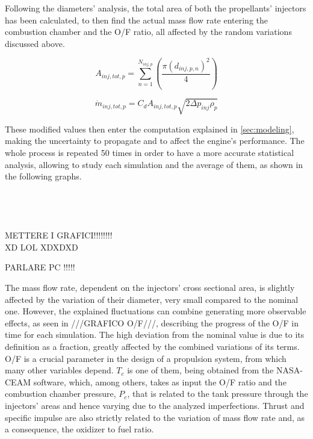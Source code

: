Following the diameters' analysis, the total area of both the propellants' injectors has been calculated, to then find the actual mass flow rate entering the combustion chamber and the O/F ratio, all affected by the random variations discussed above. 


\begin{equation}
	A_{inj,tot,p} = \sum_{n=1}^{N_{inj,p}} \left(\frac{\pi(d_{inj,p,n})^2}{4} \right)
    \label{eq:totalarea}
\end{equation}

\begin{equation}
    \dot m_{inj,tot,p} = C_{d}A_{inj,tot,p}\sqrt{2\Delta p_{inj}\rho_p}
    \label{eq:massflow}
\end{equation}

These modified values then enter the computation explained in \autoref{sec:modeling}, making the uncertainty to propagate and to affect the engine's performance. The whole process is repeated 50 times in order to have a more accurate statistical analysis, allowing to study each simulation and the average of them, as shown in the following graphs.
\\
\\
\\
\\
\\


METTERE I GRAFICI!!!!!!!!\\ XD LOL XDXDXD 


PARLARE PC !!!!!

The mass flow rate, dependent on the injectors' cross sectional area, is slightly affected by the variation of their diameter, very small compared to the nominal one. However, the explained fluctuations can combine generating more observable effects, as seen in ///GRAFICO O/F///, describing the progress of the O/F in time for each simulation. The high deviation from the nominal value is due to its definition as a fraction, greatly affected by the combined variations of its terms. O/F is a crucial parameter in the design of a propulsion system, from which many other variables depend. $T_c$ is one of them, being obtained from the NASA-CEAM software, which, among others, takes as input the O/F ratio and the combustion chamber pressure, $P_c$, that is related to the tank pressure through the injectors' areas and hence varying due to the analyzed imperfections. Thrust and specific impulse are also strictly related to the variation of mass flow rate and, as a consequence, the oxidizer to fuel ratio. 

